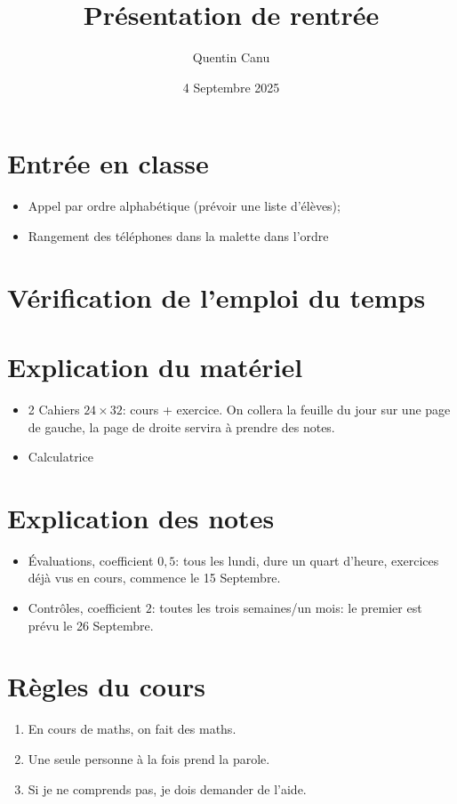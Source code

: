 \documentclass{article}
\title{Présentation de rentrée}
\date{4 Septembre 2025}
\author{Quentin Canu}
\begin{document}
\maketitle
\section{Entrée en classe}
\begin{itemize}
\item Appel par ordre alphabétique (prévoir une liste d'élèves);
\item Rangement des téléphones dans la malette dans l'ordre
\end{itemize}
\section{Vérification de l'emploi du temps}
\section{Explication du matériel}
\begin{itemize}
\item 2 Cahiers $24 \times 32$: cours + exercice. On collera la feuille du jour sur une page de gauche, la page de droite servira à prendre des notes.
\item Calculatrice
\end{itemize}
\section{Explication des notes}
\begin{itemize}
\item Évaluations, coefficient $0,5$: tous les lundi, dure un quart d'heure, exercices déjà vus en cours, commence le 15 Septembre.
\item Contrôles, coefficient $2$: toutes les trois semaines/un mois: le premier est prévu le 26 Septembre.
\end{itemize}
\section{Règles du cours}
\begin{enumerate}
\item En cours de maths, on fait des maths.
\item Une seule personne à la fois prend la parole.
\item Si je ne comprends pas, je dois demander de l'aide.
\end{enumerate}
\end{document}
